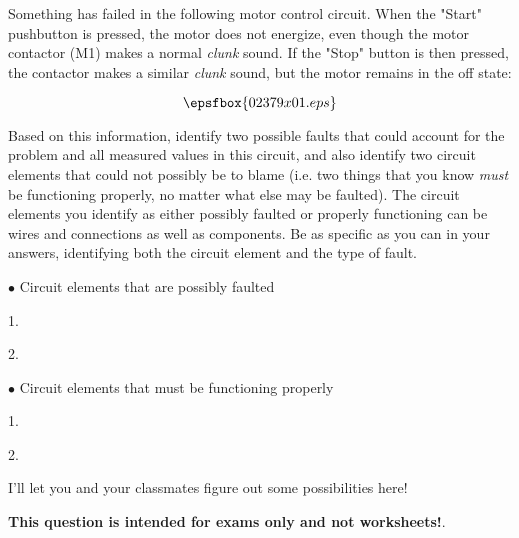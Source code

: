 

Something has failed in the following motor control circuit.  When the "Start" pushbutton is pressed, the motor does not energize, even though the motor contactor (M1) makes a normal {\it clunk} sound.  If the "Stop" button is then pressed, the contactor makes a similar {\it clunk} sound, but the motor remains in the off state:

$$\epsfbox{02379x01.eps}$$

Based on this information, identify two possible faults that could account for the problem and all measured values in this circuit, and also identify two circuit elements that could not possibly be to blame (i.e. two things that you know {\it must} be functioning properly, no matter what else may be faulted).  The circuit elements you identify as either possibly faulted or properly functioning can be wires and connections as well as components.  Be as specific as you can in your answers, identifying both the circuit element and the type of fault.

\medskip
\goodbreak
\item{$\bullet$} Circuit elements that are possibly faulted
\item{1.} 
\item{2.} 
\medskip

\medskip
\goodbreak
\item{$\bullet$} Circuit elements that must be functioning properly
\item{1.} 
\item{2.} 
\medskip







I'll let you and your classmates figure out some possibilities here!







{\bf This question is intended for exams only and not worksheets!}.




